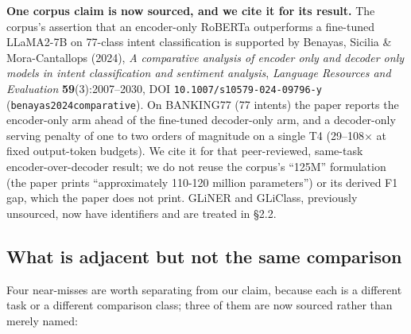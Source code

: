 \documentclass[11pt,a4paper]{article}
\begin{document}
\textbf{One corpus claim is now sourced, and we cite it for its result.} The corpus's assertion that an encoder-only RoBERTa outperforms a fine-tuned LLaMA2-7B on 77-class intent classification is supported by Benayas, Sicilia \& Mora-Cantallops (2024), \emph{A comparative analysis of encoder only and decoder only models in intent classification and sentiment analysis}, \emph{Language Resources and Evaluation} \textbf{59}(3):2007--2030, DOI \texttt{10.1007/s10579-024-09796-y} (\texttt{benayas2024comparative}\cite{benayas2024comparative}). On BANKING77 (77 intents) the paper reports the encoder-only arm ahead of the fine-tuned decoder-only arm, and a decoder-only serving penalty of one to two orders of magnitude on a single T4 (29--108$\times$ at fixed output-token budgets). We cite it for that peer-reviewed, same-task encoder-over-decoder result; we do not reuse the corpus's ``125M'' formulation (the paper prints ``approximately 110-120 million parameters'') or its derived F1 gap, which the paper does not print. GLiNER and GLiClass, previously unsourced, now have identifiers and are treated in \S2.2.

\subsection{What is adjacent but not the same comparison}

Four near-misses are worth separating from our claim, because each is a different task or a different comparison class; three of them are now sourced rather than merely named:
\end{document}
